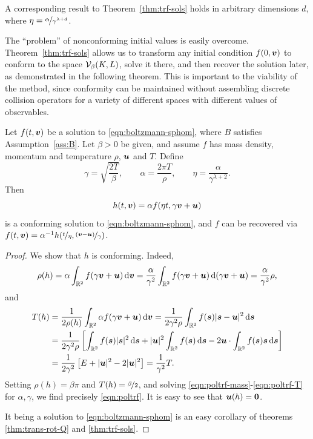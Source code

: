 \begin{remark}
    A corresponding result to Theorem~\ref{thm:trf-sols} holds in arbitrary dimensions $d$, where
    $\eta=\nicefrac{\alpha}{\gamma^{\lambda+d}}$.
\end{remark}
The ``problem'' of nonconforming initial values is easily overcome. Theorem~\ref{thm:trf-sols} allows us to
transform any initial condition $f(0,{\bm v})$ to conform to the space $\mathcal{V}_\beta(K,L)$, solve it there, and then
recover the solution later, as demonstrated in the following theorem. This is important to the viability of
the method, since conformity can be maintained without assembling discrete collision operators for a variety
of different spaces with different values of observables.
\begin{theorem} \label{thm:conf-sols}
    Let $f(t,{\bm v})$ be a solution to \eqref{eqn:boltzmann-sphom}, where $B$ satisfies Assumption~\ref{ass:B}.
    Let $\beta>0$ be given, and assume $f$ has mass density, momentum and temperature $\rho$, ${\bm u}$ and $T$.
    Define
    \begin{equation} \label{eqn:poltrf}
        \gamma = \sqrt{\frac{2T}{\beta}}, \qquad
        \alpha = \frac{2\pi T}{\rho}, \qquad
        \eta   = \frac{\alpha}{\gamma^{\lambda+2}}.
    \end{equation}
    Then
    \[
        h(t,{\bm v})=\alpha f(\eta t, \gamma{\bm v} + {\bm u})
    \]
    is a conforming solution to \eqref{eqn:boltzmann-sphom}, and $f$ can be recovered via $f(t,{\bm v}) =
    \alpha^{-1} h(\nicefrac{t}{\eta}, \nicefrac{({\bm v}-{\bm u})}{\gamma})$.
\end{theorem}
\begin{proof}
    We show that $h$ is conforming. Indeed,
    \begin{equation} \label{eqn:poltrf-mass}
        \rho(h) = \alpha\int_{\mathbb{R}^2} f(\gamma{\bm v}+{\bm u}) \,\mathrm{d}{\bm v}
        = \frac{\alpha}{\gamma^2}\int_{\mathbb{R}^2} f(\gamma{\bm v}+{\bm u}) \,\mathrm{d}(\gamma{\bm v}+{\bm u})
        = \frac{\alpha}{\gamma^2}\rho,
    \end{equation}
    and
    \begin{align}
        \nonumber T(h) &= \frac{1}{2\rho(h)} \int_{\mathbb{R}^2} \alpha f(\gamma{\bm v}+{\bm u}) \,\mathrm{d}{\bm v}
        = \frac{1}{2\gamma^2\rho}\int_{\mathbb{R}^2} f({\bm s})|{\bm s}-{\bm u}|^2\,\mathrm{d}{\bm s} \\
        \nonumber &= \frac{1}{2\gamma^2\rho}\left[ \int_{\mathbb{R}^2}f({\bm s})|{\bm s}|^2\,\mathrm{d}{\bm s} +
           |{\bm u}|^2\int_{\mathbb{R}^2}f({\bm s})\,\mathrm{d}{\bm s} - 2{\bm u}\cdot\int_{\mathbb{R}^2}f({\bm s}){\bm s}\,\mathrm{d}{\bm s}\right] \\
        &= \frac{1}{2\gamma^2}\left[E + |{\bm u}|^2 - 2|{\bm u}|^2\right] = \frac{1}{\gamma^2}T.
        \label{eqn:poltrf-T}
    \end{align}
    Setting $\rho(h)=\beta\pi$ and $T(h)=\nicefrac{\beta}{2}$, and solving
    \eqref{eqn:poltrf-mass}-\eqref{eqn:poltrf-T} for $\alpha,\gamma$, we find precisely \eqref{eqn:poltrf}. It
    is easy to see that ${\bm u}(h)={\bm0}$.
    
    It being a solution to \eqref{eqn:boltzmann-sphom} is an easy corollary of theorems \ref{thm:trans-rot-Q}
    and \ref{thm:trf-sols}.
\end{proof}


